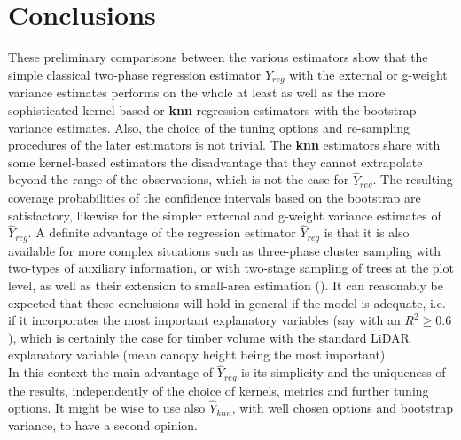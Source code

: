 \documentclass[a4paper,12pt,leqno, titlepage]{article}
\begin{document}
\section{Conclusions}
These preliminary comparisons between the various estimators show that the simple classical two-phase regression estimator $\hat{Y}_{reg}$ with the external or g-weight variance estimates performs on the whole at least as well as the more sophisticated kernel-based or \textbf{knn} regression estimators with the bootstrap variance estimates. Also, the choice of the tuning options and re-sampling procedures of the later estimators is not trivial. The \textbf{knn} estimators share with some kernel-based estimators the disadvantage that they cannot extrapolate beyond the range of the observations, which is not the case for $\hat{Y}_{reg}$. The resulting coverage probabilities of the confidence intervals based on the bootstrap are satisfactory, likewise for the simpler external and g-weight variance estimates of $\hat{Y}_{reg}$. A definite advantage of the regression estimator $\hat{Y}_{reg}$ is that it is also available for more complex situations such as three-phase cluster sampling with two-types of auxiliary information, or with two-stage sampling of trees at the plot level, as well as their extension to small-area estimation (\cite{mandallaz3,mandallaz4,mandallaz5}). It can reasonably be expected that these conclusions will hold in general if the model is adequate, i.e. if it incorporates the most important explanatory variables (say with an $R^2 \ge 0.6$), which is certainly the case for timber volume with the standard LiDAR explanatory variable (mean canopy height being the most important). \\
In this context the main advantage of $\hat{Y}_{reg}$ is its simplicity and the uniqueness of the results, independently of the choice of kernels, metrics and further tuning options. It might be wise to use also $\hat{Y}_{knn}$, with well chosen options and bootstrap variance, to have a second opinion.


\newpage

\newpage
\end{document}
